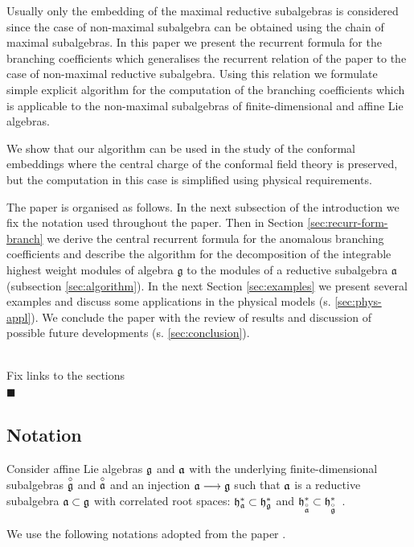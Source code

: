 \documentclass[a4paper,12pt]{article}
\theoremstyle{definition} \newtheorem{Def}{Definition}
\newenvironment{comment}
{\par\noindent{\bf TODO}\\}
{\\\hfill$\scriptstyle\blacksquare$\par}
\begin{document}
Usually only the embedding of the maximal reductive subalgebras is considered since the case of non-maximal subalgebra can be obtained using the chain of maximal subalgebras. In this paper we present the recurrent formula for the branching coefficients which generalises the recurrent relation of the paper \cite{ilyin812pbc} to the case of non-maximal reductive subalgebra. Using this relation we formulate simple explicit algorithm for the computation of the branching coefficients which is applicable to the non-maximal subalgebras of finite-dimensional and affine Lie algebras.

We show that our algorithm can be used in the study of the conformal embeddings where the central charge of the conformal field theory is preserved, but the computation in this case is simplified using physical requirements.

The paper is organised as follows. In the next subsection of the introduction we fix the notation used throughout the paper. Then in Section \ref{sec:recurr-form-branch} we derive the central recurrent formula for the anomalous branching coefficients and describe the algorithm for the decomposition of the integrable highest weight modules of algebra $\mathfrak{g}$ to the modules of a reductive subalgebra $\mathfrak{a}$ (subsection \ref{sec:algorithm}). In the next Section \ref{sec:examples} we present several examples and discuss some applications in the physical models (s. \ref{sec:phys-appl}). We conclude the paper with the review of results and discussion of possible future developments (s. \ref{sec:conclusion}).
\begin{comment}
  Fix links to the sections
\end{comment}

\subsection{Notation}
\label{sec:notation}

Consider affine Lie algebras $\frak{g}$ and $\frak{a}$ with the
underlying finite-dimensional subalgebras $\overset{\circ }{\frak{g}}$ and $%
\overset{\circ }{\frak{a}}$ and an injection $\frak{a}\longrightarrow \frak{g%
}$ such that $\frak{a}$ is a reductive subalgebra $\frak{a\subset g}$ with
correlated root spaces: $\frak{h}_{\frak{a}}^{\ast }\subset \frak{h}_{\frak{g%
}}^{\ast }$ and $\frak{h}_{\overset{\circ }{\frak{a}}}^{\ast }\subset \frak{h%
}_{\overset{\circ }{\frak{g}}}^{\ast }$\ .

We use the following notations adopted from the paper \cite{ilyin812pbc}.
\end{document}

